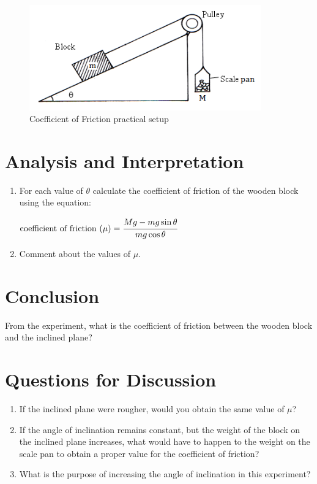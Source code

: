\begin{figure}[h!]
\centering
\includegraphics[width=10cm]{./img/coefficient-friction-1.png}
\caption{Coefficient of Friction practical setup}
\label{fig:coefficient-friction-1}
\end{figure}

\section{Analysis and Interpretation}
\begin{enumerate}
\item For each value of $\theta$ calculate the coefficient of friction of the wooden block using the equation:

\begin{center}
$\text{coefficient of friction }(\mu)=\cfrac{Mg-mg\sin \theta}{mg\cos \theta}$
\end{center}
 
\item Comment about the values of $\mu$.
\end{enumerate}

\section{Conclusion}
From the experiment, what is the coefficient of friction between the wooden block and the inclined plane?

\section{Questions for Discussion}
\begin{enumerate}
\item If the inclined plane were rougher, would you obtain the same value of $\mu$?
\item If the angle of inclination remains constant, but the weight of the block on the inclined plane increases, what would have to happen to the weight on the scale pan to obtain a proper value for the coefficient of friction?
\item What is the purpose of increasing the angle of inclination in this experiment?
\end{enumerate}

